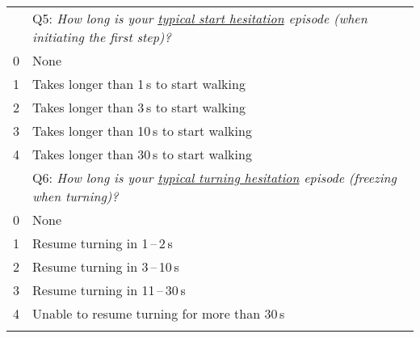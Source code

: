 \begin{table}[htb!]
\begin{threeparttable}
\begin{tabularx}{1.00\textwidth}{c X}
				& Q5: \textit{How long is your \underline{typical start hesitation} episode (when initiating the first step)?} \\
			0 & None \\
			1 & Takes longer than 1\,s to start walking \\
			2 & Takes longer than 3\,s to start walking \\
			3 & Takes longer than 10\,s to start walking \\
			4 & Takes longer than 30\,s to start walking \\
			\noalign{\smallskip}\hline

				& Q6: \textit{How long is your \underline{typical turning hesitation} episode (freezing when turning)?} \\
			0 & None \\
			1 & Resume turning in 1\,--\,2\,s \\
			2 & Resume turning in 3\,--\,10\,s \\
			3 & Resume turning in 11\,--\,30\,s \\
			4 & Unable to resume turning for more than 30\,s \\
			
			\noalign{\smallskip}\hline\hline
		\end{tabularx}    
	\end{threeparttable}
\end{table}